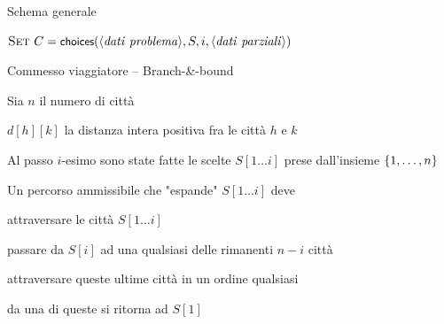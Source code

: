 \begin{frame}{Schema generale}

\vspace{-12pt}
\begin{Procedure}
\caption[A]{\branchbound($\langle \mathit{dati\ problema} \rangle$, $\Item[\,]\ S$, \INTEGER\ $i$, $\langle \mathit{dati\ parziali} \rangle$)}
$\textsc{Set}\ C = \textsf{{\small choices}}(\langle \mathit{dati\ problema} \rangle, S, i, \langle \mathit{dati\ parziali} \rangle)$\;
\end{Procedure}

\end{frame}

\begin{frame}{Commesso viaggiatore -- Branch-\&-bound}

\vspace{-9pt}
\BIL
\item Sia $n$ il numero di città
\item $d[h][k]$ la distanza intera positiva fra le città $h$ e $k$
\item Al passo $i$-esimo sono state fatte le scelte $S[1 \ldots i]$ 
prese dall'insieme $\{1, \ldots, n\}$
\item Un percorso ammissibile che "espande" $S[1 \ldots i]$ deve
  \BI
  \item attraversare le città $S[1 \ldots i]$
  \item passare da $S[i]$ ad una qualsiasi delle rimanenti $n - i$ città
  \item attraversare queste ultime città in un ordine qualsiasi
  \item da una di queste si ritorna ad $S[1]$
  \EI
\EIL
\end{frame}



